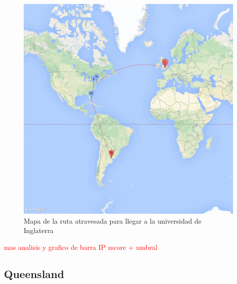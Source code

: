 \begin{figure}[H]
	\begin{center}
		  \includegraphics[scale=0.25]{../results/maps/Oxford.png}
		  \caption{Mapa de la ruta atravesada para llegar a la universidad de Inglaterra}
	\end{center}
\end{figure}

\textcolor{red}{mas analisis y grafico de barra IP zscore + umbral}

\subsection{Queensland}

~

